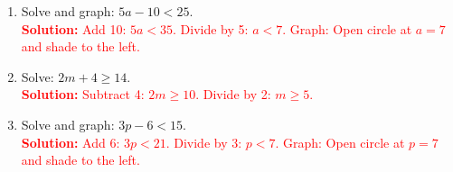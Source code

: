 \documentclass[12pt]{article}
\begin{document}
\begin{tcolorbox}[colframe=black!60, colback=white, 
coltitle=black, colbacktitle=black!15, fonttitle=\bfseries\Large, 
title=Exercises, halign title=center, left=10pt, right=10pt, top=10pt, bottom=60pt]
\begin{enumerate}[itemsep=3em]
    \item Solve and graph: \( 5a - 10 < 25 \).\\
    \textcolor{red}{\textbf{Solution:} Add 10: \( 5a < 35 \). Divide by 5: \( a < 7 \). Graph: Open circle at \( a = 7 \) and shade to the left.}

    \item Solve: \( 2m + 4 \geq 14 \).\\
    \textcolor{red}{\textbf{Solution:} Subtract 4: \( 2m \geq 10 \). Divide by 2: \( m \geq 5 \).}

    \item Solve and graph: \( 3p - 6 < 15 \).\\
    \textcolor{red}{\textbf{Solution:} Add 6: \( 3p < 21 \). Divide by 3: \( p < 7 \). Graph: Open circle at \( p = 7 \) and shade to the left.}
\end{enumerate}
\end{tcolorbox}
\end{document}

